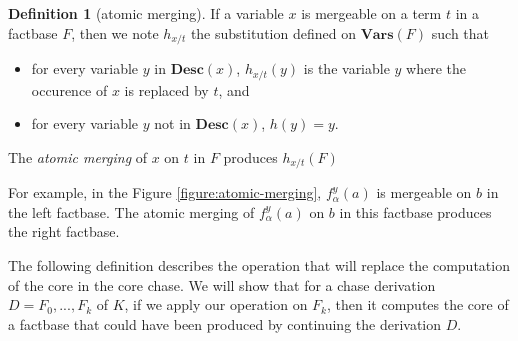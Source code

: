 \documentclass{article}
\theoremstyle{definition}
\newtheorem{definition}{Definition}[section]
\theoremstyle{remark}
\newcommand{\Vars}{\textbf{Vars}}
\newcommand{\des}{\textbf{Desc}}
\begin{document}
\begin{definition}[atomic merging]
If a variable $x$ is mergeable on a term $t$ in a factbase $F$, then we note $h_{x/t}$ the substitution defined on $\Vars(F)$ such that 
\begin{itemize}
\item for every variable $y$ in $\des(x)$, $h_{x/t}(y)$ is the variable $y$ where the occurence of $x$ is replaced by $t$, and 
\item for every variable $y$ not in $\des(x)$, $h(y) = y$. 
\end{itemize}

The \emph{atomic merging} of $x$ on $t$ in $F$ produces $h_{x/t}(F)$ 
\end{definition}

For example, in the Figure \ref{figure:atomic-merging}, $f_\alpha^y(a)$ is mergeable on $b$ in the left factbase. The atomic merging of $f_\alpha^y(a)$ on $b$ in this factbase produces the right factbase.

The following definition describes the operation that will replace the computation of the core in the core chase. We will show that for a chase derivation $D =F_0,...,F_k$ of $K$, if we apply our operation on $F_k$, then it computes the core of a factbase that could have been produced by continuing the derivation $D$.
\end{document}

